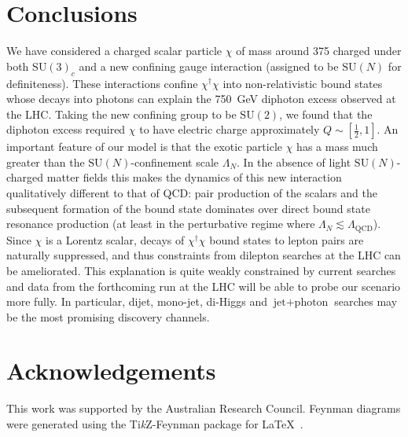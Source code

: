 \section*{Conclusions}

We have considered a charged scalar particle $\chi$ of mass around
\si{375}{\GeV} charged under both $\mathrm{SU}(3)_{c}$ and a new confining gauge
interaction (assigned to be $\mathrm{SU}(N)$ for definiteness). These
interactions confine $\chi^\dagger\chi$ into non-relativistic bound states whose
decays into photons can explain the \SI{750}{\GeV} diphoton excess observed at
the LHC. Taking the new confining group to be $\mathrm{SU}(2)$, we found that
the diphoton excess required $\chi$ to have electric charge approximately
$Q \sim [\frac{1}{2}, 1]$. An important feature of our model is that the exotic
particle $\chi$ has a mass much greater than the $\mathrm{SU}(N)$-confinement
scale $\Lambda_{N}$. In the absence of light $\mathrm{SU}(N)$-charged matter
fields this makes the dynamics of this new interaction qualitatively different
to that of QCD: pair production of the scalars and the subsequent formation of
the bound state dominates over direct bound state resonance production (at least
in the perturbative regime where $\Lambda_{N} \lesssim \Lambda_{\text{QCD}}$). Since
$\chi$ is a Lorentz scalar, decays of $\chi^\dagger \chi$ bound states to lepton
pairs are naturally suppressed, and thus constraints from dilepton searches at
the LHC can be ameliorated. This explanation is quite weakly constrained by
current searches and data from the forthcoming run at the LHC will be able to
probe our scenario more fully. In particular, dijet, mono-jet, di-Higgs and
$\text{jet} + \text{photon}$ searches may be the most promising discovery
channels.

\section*{Acknowledgements}

This work was supported by the Australian Research Council. Feynman diagrams
were generated using the Ti\textit{k}Z-Feynman package for
\LaTeX~\cite{Ellis:2016jkw}.
